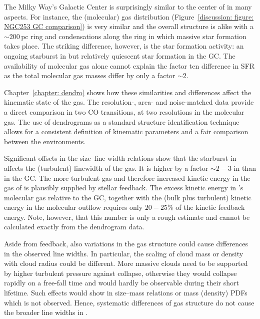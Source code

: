 The Milky Way's Galactic Center is surprisingly similar to the center of  in many aspects. For instance, the (molecular) gas distribution (Figure~\ref{discussion: figure: NGC253 GC comparison}) is very similar and the overall structure is alike with a $\sim 200$\,pc ring and condensations along the ring in which massive star formation takes place. The striking difference, however, is the star formation activity: an ongoing starburst in  \citep[$SFR = 1.7-2.8$\,\Msunyr][]{Ott:2005il,Leroy:2015ds,2015MNRAS.450L..80B} but relatively quiescent star formation \citep[$SFR \sim 0.1$\,\Msunyr;][]{2017MNRAS.469.2263B} in the GC. The availability of molecular gas alone cannot explain the factor ten difference in SFR as the total molecular gas masses differ by only a factor $\sim 2$.

Chapter~\ref{chapter: dendro} shows how these similarities and differences affect the kinematic state of the gas. 
The resolution-, area- and noise-matched data provide a direct comparison in two CO transitions, at two resolutions in the molecular gas.
The use of dendrograms as a standard structure identification technique allows for a consistent definition of kinematic parameters and a fair comparison between the environments.

Significant offsets in the size--line width relations show that the starburst in  affects the (turbulent) linewidth of the gas. It is higher by a factor $\sim 2-3$ in  than in the GC.
The more turbulent gas and therefore increased kinetic energy in the gas of  is plausibly supplied by stellar feedback. 
The excess kinetic energy in 's molecular gas relative to the GC, together with the (bulk plus turbulent) kinetic energy in the molecular outflow requires only $20-25$\% of the kinetic feedback energy. Note, however, that this number is only a rough estimate and cannot be calculated exactly from the dendrogram data.

Aside from feedback, also variations in the gas structure could cause differences in the observed line widths.
In particular, the scaling of cloud mass or density with cloud radius could be different. More massive clouds need to be supported by higher turbulent pressure against collapse, otherwise they would collapse rapidly on a free-fall time and would hardly be observable during their short lifetime. 
Such effects would show in size--mass relations or mass (density) PDFs which is not observed. 
Hence, systematic differences of gas structure do not cause the broader line widths in .


